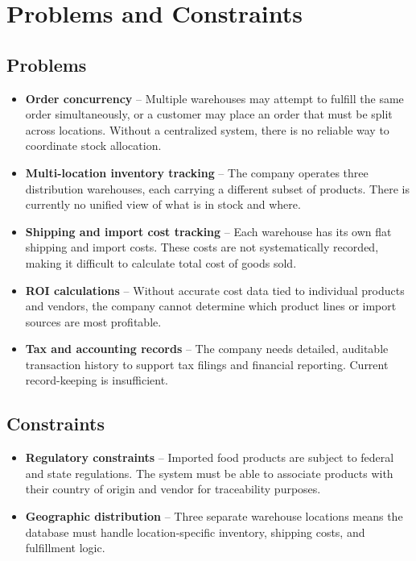 \section{Problems and Constraints}

\subsection{Problems}

\begin{itemize}
  \item \textbf{Order concurrency} -- Multiple warehouses may attempt to fulfill the same order
    simultaneously, or a customer may place an order that must be split across locations. Without a
    centralized system, there is no reliable way to coordinate stock allocation.
  \item \textbf{Multi-location inventory tracking} -- The company operates three distribution
    warehouses, each carrying a different subset of products. There is currently no unified view of
    what is in stock and where.
  \item \textbf{Shipping and import cost tracking} -- Each warehouse has its own flat shipping and
    import costs. These costs are not systematically recorded, making it difficult to calculate
    total cost of goods sold.
  \item \textbf{ROI calculations} -- Without accurate cost data tied to individual products and
    vendors, the company cannot determine which product lines or import sources are most profitable.
  \item \textbf{Tax and accounting records} -- The company needs detailed, auditable transaction
    history to support tax filings and financial reporting. Current record-keeping is insufficient.
\end{itemize}

\subsection{Constraints}

\begin{itemize}
  \item \textbf{Regulatory constraints} -- Imported food products are subject to federal and state
    regulations. The system must be able to associate products with their country of origin and
    vendor for traceability purposes.
  \item \textbf{Geographic distribution} -- Three separate warehouse locations means the database
    must handle location-specific inventory, shipping costs, and fulfillment logic.
\end{itemize}

